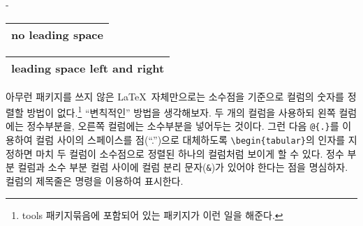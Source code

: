 \begin{adjustwidth}{0pt}{-\margheadwidth}

\begin{example}
\begin{tabular}{@{} l @{}}
\hline
no leading space\\
\hline
\end{tabular}
\end{example}

\vspace{-.5\onelineskip}

\begin{example}
\begin{tabular}{l}
\hline
leading space left and right\\
\hline
\end{tabular}
\end{example}


아무런 패키지를 쓰지 않은 \LaTeX\ 자체만으로는 소수점을 기준으로 컬럼의 숫자를 정렬할 방법이 없다.\footnote{%
  \textsf{tools} 패키지묶음에 포함되어 있는  패키지가 이런 일을 해준다.
}
``변칙적인'' 방법을 생각해보자. 두 개의 컬럼을 사용하되 왼쪽 컬럼에는 정수부분을, 오른쪽 컬럼에는 소수부분을 넣어두는 것이다.
그런 다음 \verb|@{.}|를 이용하여 컬럼 사이의 스페이스를 점(``.'')으로 대체하도록 \verb|\begin{tabular}|의 인자를
  지정하면 마치 두 컬럼이 소수점으로 정렬된 하나의 컬럼처럼 보이게 할 수 있다.
정수 부분 컬럼과 소수 부분 컬럼 사이에 컬럼 분리 문자(\verb|&|)가 있어야 한다는 점을 명심하자.
컬럼의 제목줄은  명령을 이용하여 표시한다.


\end{adjustwidth}
